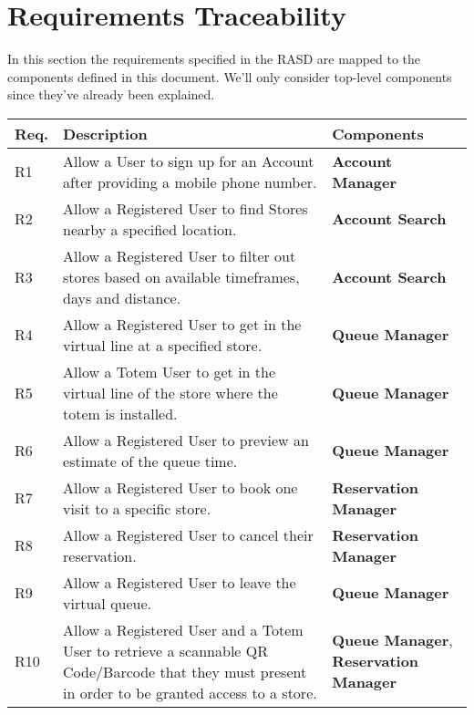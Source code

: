 
\section{Requirements Traceability}

In this section the requirements specified in the RASD are mapped to the components defined in this document. We'll only consider top-level components since they've already been explained.

\def\arraystretch{1.5}
\begin{longtable}{p{} p{} p{}}
    \textbf{Req.} & \textbf{Description} & \textbf{Components}\\
    \hline
    R1 & Allow a User to sign up for an Account after providing a mobile phone number. & \textbf{Account Manager}\\
    R2 & Allow a Registered User to find Stores nearby a specified location. & \textbf{Account Search}\\
    R3 & Allow a Registered User to filter out stores based on available timeframes, days and distance. & \textbf{Account Search}\\
    R4 & Allow a Registered User to get in the virtual line at a specified store. & \textbf{Queue Manager}\\
    R5 & Allow a Totem User to get in the virtual line of the store where the totem is installed. & \textbf{Queue Manager}\\
    R6 & Allow a Registered User to preview an estimate of the queue time. & \textbf{Queue Manager}\\
    R7 & Allow a Registered User to book one visit to a specific store. & \textbf{Reservation Manager}\\
    R8 & Allow a Registered User to cancel their reservation. & \textbf{Reservation Manager}\\
    R9 & Allow a Registered User to leave the virtual queue. & \textbf{Queue Manager}\\
    R10 & Allow a Registered User and a Totem User to retrieve a scannable QR Code/Barcode that they must present in order to be granted access to a store. & \textbf{Queue Manager}, \textbf{Reservation Manager}\\


\end{longtable}
